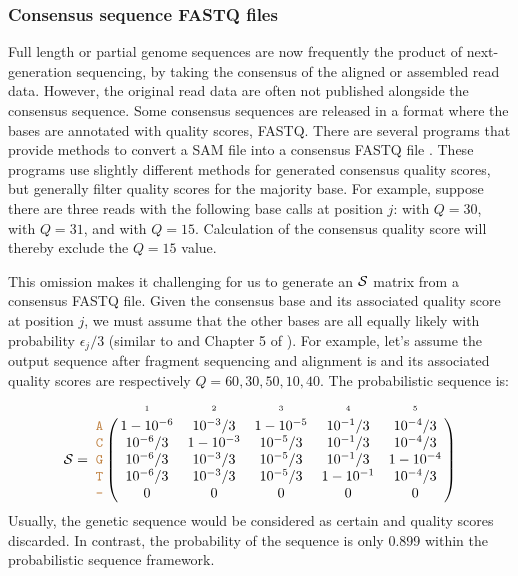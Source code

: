 \documentclass[10pt]{article}
\begin{document}
\subsubsection{Consensus sequence FASTQ files}
\label{fastq_construction}

Full length or partial genome sequences are now frequently the product of next-generation sequencing, by taking the consensus of the aligned or assembled read data.
However, the original read data are often not published alongside the consensus sequence.
Some consensus sequences are released in a format where the bases are annotated with quality scores, \eg FASTQ.
There are several programs that provide methods to convert a SAM file into a consensus FASTQ file \citep{liAdjustQualityScores2004, keithSimulatedAnnealingAlgorithm2002, liMappingShortDNA2008a}.
These programs use slightly different methods for generated consensus quality scores, but generally filter quality scores for the majority base.
For example, suppose there are three reads with the following base calls at position $j$:  with $Q=30$,  with $Q=31$, and  with $Q=15$.
Calculation of the consensus quality score will thereby exclude the $Q=15$ value.


This omission makes it challenging for us to generate an $\mathcal{S}$ matrix from a consensus FASTQ file.
Given the consensus base and its associated quality score at position $j$, we must assume that the other bases are all equally likely with probability $\epsilon_j/3$ (similar to \cite{kuoEAGLEExplicitAlternative2018} and Chapter 5 of \citet{kozlovModelsOptimizationsTools2018}).
For example, let's assume the output sequence after fragment sequencing and alignment is  and its associated quality scores are respectively $Q=60,30,50,10,40$.
The probabilistic sequence is:
\begin{equation}
\nps = 
\bordermatrix{
&\scriptscriptstyle{1} & \scriptscriptstyle{2}& \scriptscriptstyle{3}& \scriptscriptstyle{4} & \scriptscriptstyle{5} \cr
\sq{A} & 1-10^{-6} & 10^{-3}/3  & 1-10^{-5} & 10^{-1}/3 & 10^{-4}/3  \cr
\sq{C} & 10^{-6}/3 & 1-10^{-3}  & 10^{-5}/3 & 10^{-1}/3 & 10^{-4}/3  \cr
\sq{G} & 10^{-6}/3 & 10^{-3}/3  & 10^{-5}/3 & 10^{-1}/3 & 1-10^{-4} \cr
\sq{T} & 10^{-6}/3 & 10^{-3}/3  & 10^{-5}/3 & 1-10^{-1} & 10^{-4}/3 \cr
\sq{-} & 0 & 0 & 0 & 0 & 0 \cr
}
\end{equation}
Usually, the genetic sequence  would be considered as certain and quality scores discarded.
In contrast, the probability of the sequence  is only 0.899 within the probabilistic sequence framework.
\end{document}
